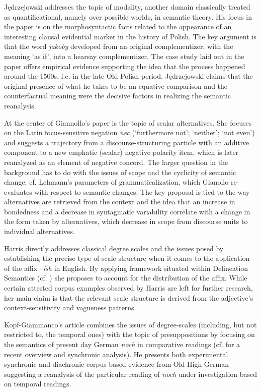 \documentclass[output=paper]{langsci/langscibook}
\begin{document}
Jędrzejowski addresses the topic of modality, another domain classically\linebreak
treated as quantificational, namely over possible worlds, in semantic theory. His focus in the paper is on the morphosyntactic facts related to the appearance of an interesting clausal evidential marker in the history of Polish.  The key argument is that the word \textit{jakoby} developed from an original complementizer, with the meaning ‘as if’, into a hearsay complementizer. The case study laid out in the paper offers empirical evidence supporting the idea that the process happened around the 1500s, i.e. in the late Old Polish period. Jędrzejowski claims that the original presence of what he takes to be an equative comparison and the counterfactual meaning were the decisive factors in realizing the semantic reanalysis.

At the center of Giannollo’s paper is the topic of scalar alternatives. She focuses on the Latin focus-sensitive negation \textit{nec} (`furthermore not'; `neither'; `not even') and suggests a trajectory from a discourse-structuring particle with an additive component to a new emphatic (scalar) negative polarity item, which is later reanalyzed as an element of negative concord. The larger question in the background has to do with the issues of scope and the cyclicity of semantic change; cf. Lehmann’s parameters of grammaticalization, which Gianollo re-evaluates with respect to semantic changes. The key proposal is tied to the way alternatives are retrieved from the context and the idea that an increase in bondedness and a decrease in syntagmatic variability correlate with a change in the form taken by alternatives, which decrease in scope from discourse units to individual alternatives.

Harris directly addresses classical degree scales and the issues posed by establishing the precise type of scale structure when it comes to the application of the affix –\textit{ish} in English. By applying  framework situated within Delineation Semantics (cf. \citealt{Cobreros2012}) she proposes to account for the distribution of the affix. While certain attested corpus examples observed by Harris are left for further research, her main claim is that the relevant scale structure is derived from the adjective’s context-sensitivity and vagueness patterns.

Kopf-Giammanco’s article combines the issues of degree-scales (including, but not restricted to, the temporal ones) with the topic of presuppositions by focusing on the semantics of present day German \textit{noch} in comparative readings (cf. \citealt{Beck2019} for a recent overview and synchronic analysis). He presents both experimental synchronic and diachronic corpus-based evidence from Old High German suggesting a reanalysis of the particular reading of \textit{noch} under investigation based on temporal readings.
\end{document}
